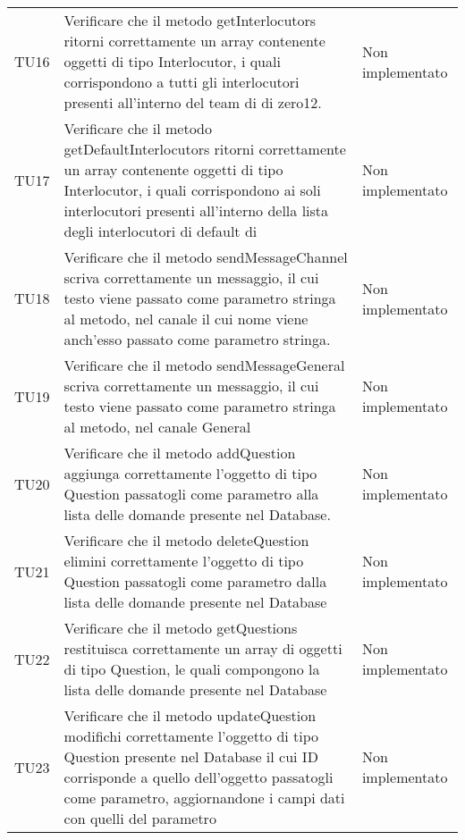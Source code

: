 \documentclass[../PianoDiQualifica.tex]{subfiles}
\begin{document}
\begin{longtable}[c] { >{\centering\arraybackslash}p{4cm} p{7cm} >{\centering\arraybackslash}p{4cm}}
			\addlinespace[0.3em]
			\midrule
			\addlinespace[0.3em]
			TU16 & Verificare che il metodo getInterlocutors ritorni correttamente un array contenente oggetti di tipo Interlocutor, i quali corrispondono a tutti gli interlocutori presenti all'interno del team di di zero12. & Non implementato \\ 
			\addlinespace[0.3em]
			\midrule
			\addlinespace[0.3em]
			TU17 & Verificare che il metodo getDefaultInterlocutors ritorni correttamente un array contenente oggetti di tipo Interlocutor, i quali corrispondono ai soli interlocutori presenti all'interno della lista degli interlocutori di default di \prop\ & Non implementato \\ 
			\addlinespace[0.3em]
			\midrule
			\addlinespace[0.3em]
			TU18 & Verificare che il metodo sendMessageChannel scriva correttamente un messaggio, il cui testo viene passato come parametro stringa al metodo, nel canale il cui nome viene anch'esso passato come parametro stringa. & Non implementato \\
			\addlinespace[0.3em]
			\midrule
			\addlinespace[0.3em]
			TU19 & Verificare che il metodo sendMessageGeneral scriva correttamente un messaggio, il cui testo viene passato come parametro stringa al metodo, nel canale General & Non implementato \\ 
			\addlinespace[0.3em]
			\midrule
			\addlinespace[0.3em]
			TU20 & Verificare che il metodo addQuestion aggiunga correttamente l'oggetto di tipo Question passatogli come parametro alla lista delle domande presente nel Database. & Non implementato \\ 
			\addlinespace[0.3em]
			\midrule
			\addlinespace[0.3em]
			TU21 & Verificare che il metodo deleteQuestion elimini correttamente l'oggetto di tipo Question passatogli come parametro dalla lista delle domande presente nel Database & Non implementato \\ 
			\addlinespace[0.3em]
			\midrule
			\addlinespace[0.3em]
			TU22 & Verificare che il metodo getQuestions restituisca correttamente un array di oggetti di tipo Question, le quali compongono la lista delle domande presente nel Database & Non implementato \\ 
			\addlinespace[0.3em]
			\midrule
			\addlinespace[0.3em]
			TU23 & Verificare che il metodo updateQuestion modifichi correttamente l'oggetto di tipo Question presente nel Database il cui ID corrisponde a quello dell'oggetto passatogli come parametro, aggiornandone i campi dati con quelli del parametro & Non implementato \\ 

\end{longtable}
\end{document}
